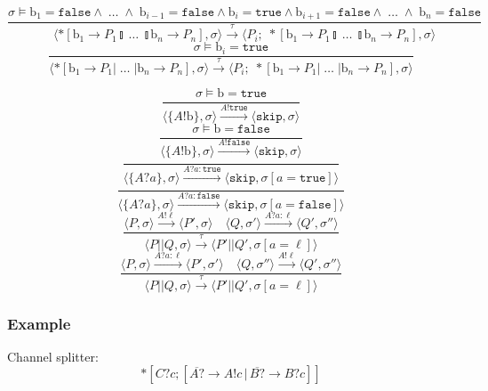 \documentclass[compress]{beamer}
\begin{document}
\begin{frame}
$$    %
        \frac{\sigma \models \mathrm{b}_1 = \mathtt{false} \wedge \; \ldots \; \wedge \; \mathrm{b}_{i-1} = \mathtt{false} \wedge \mathrm{b}_i = \mathtt{true} \wedge \mathrm{b}_{i+1} = \mathtt{false} \wedge \; \ldots \; \wedge \; \mathrm{b}_n = \mathtt{false}} {\langle *[ \mathrm{b}_1 \rightarrow P_1  \talloblong \; \ldots \; \talloblong \mathrm{b}_n \rightarrow P_n ] , \sigma \rangle \xrightarrow{\tau} \langle P_i; \; *[ \mathrm{b}_1 \rightarrow P_1  \talloblong \; \ldots \; \talloblong \mathrm{b}_n \rightarrow P_n ] , \sigma\rangle  } $$$$
        \frac{\sigma \models \mathrm{b}_i = \mathtt{true}} {\langle *[ \mathrm{b}_1 \rightarrow P_1  | \; \ldots \; | \mathrm{b}_n \rightarrow P_n ] , \sigma \rangle \xrightarrow{\tau} \langle P_i;\;*[ \mathrm{b}_1 \rightarrow P_1  | \; \ldots \; | \mathrm{b}_n \rightarrow P_n ] , \sigma\rangle  }
    $$
\end{frame}
\begin{frame}
    \small
    $$
        \frac{\sigma \models \mathrm{b} = \mathtt{true}}{\langle \{A!\mathrm{b}\}, \sigma \rangle \xrightarrow{A!\mathtt{true}} \langle \mathtt{skip}, \sigma \rangle} $$$$
        \frac{\sigma \models \mathrm{b} = \mathtt{false}}{\langle \{A!\mathrm{b}\}, \sigma \rangle \xrightarrow{A!\mathtt{false}} \langle \mathtt{skip}, \sigma \rangle} $$$$
        \frac{}{\langle \{A?a\}, \sigma \rangle \xrightarrow{A?a : \mathtt{true}} \langle \mathtt{skip}, \sigma[a = \mathtt{true}] \rangle} $$$$
        \frac{}{\langle \{A?a\}, \sigma \rangle \xrightarrow{A?a : \mathtt{false}} \langle \mathtt{skip}, \sigma[a = \mathtt{false}] \rangle} $$$$
        \frac{\langle P, \sigma \rangle \xrightarrow{A!\ell} \langle P', \sigma \rangle \quad \langle Q, \sigma' \rangle \xrightarrow{A?a : \ell} \langle Q', \sigma'' \rangle}{\langle P || Q, \sigma \rangle \xrightarrow{\tau} \langle P' || Q', \sigma[a = \ell] \rangle} $$$$
        \frac{\langle P, \sigma \rangle \xrightarrow{A?a : \ell} \langle P', \sigma' \rangle \quad \langle Q, \sigma'' \rangle \xrightarrow{A!\ell} \langle Q', \sigma'' \rangle}{\langle P || Q, \sigma \rangle \xrightarrow{\tau} \langle P' || Q', \sigma[a = \ell] \rangle}
    $$
\end{frame}
\begin{frame}
    \frametitle{Example}
    Channel splitter:
    {\small $$*[C?c; [\overline{A?} \rightarrow A!c \, | \, \overline{B?} \rightarrow B?c]]$$}
\end{frame}
\end{document}
